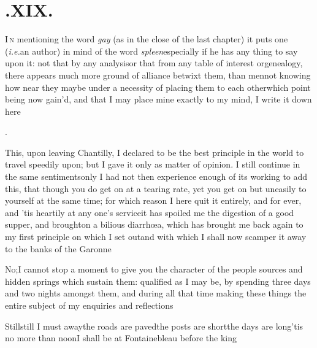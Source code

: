 \documentclass{article}
\begin{document}
\section{.\enspace XIX.}

\lettrine{I}{\,n} mentioning the word \textit{gay} (as
in the close of the last chapter) it puts one (\textit{i.e.}\@ an
author) in mind of the word \textit{spleen}\tsh especially
if he has any thing to say upon it: not that by any
analysis\break\tsk or that from any table of interest or\break genealogy,
there appears much more ground of alliance betwixt them, than
\break
men\tsk not knowing how near they may\pb be
under a necessity of placing them to each other\tsh which
point being now gain’d, and that I may place mine exactly to
my mind, I write it down here\tsh

\bigskip
\centerline{.}

This, upon leaving Chantilly, I declared to be the best principle in the world to
travel speedily upon; but I gave it only as matter of opinion. I still continue in
the same sentiments\tsk\break only I had not then experience enough of its working to add
this, that though you do get on at a tearing rate, yet you get on but uneasily to
yourself at the same time; for which reason I here quit it entirely, and for ever,
and ’tis heartily at any one’s service\tsk it has spoiled me the digestion of a good
supper, and brought\pb on a bilious diarrhœa, which has brought me back again to my
first principle on which I set out\tsh and with which I shall now scamper it away to
the banks of the Garonne\tsk

\tsk No;\tsk I cannot stop a moment to give you the character of the people\break
{}
\break
sources and hidden springs which sustain them: qualified as I may be, by spending
three days and two nights amongst them, and during all that time making these things
the entire subject of my enquiries and reflections\tsh

\newpage
Still\tsk still I must away\tsh the roads are paved\tsk the posts are short\tsk the days
are long\tsk ’tis no more than noon\tsk I shall be at Fontainebleau before the king\tsh
\end{document}
